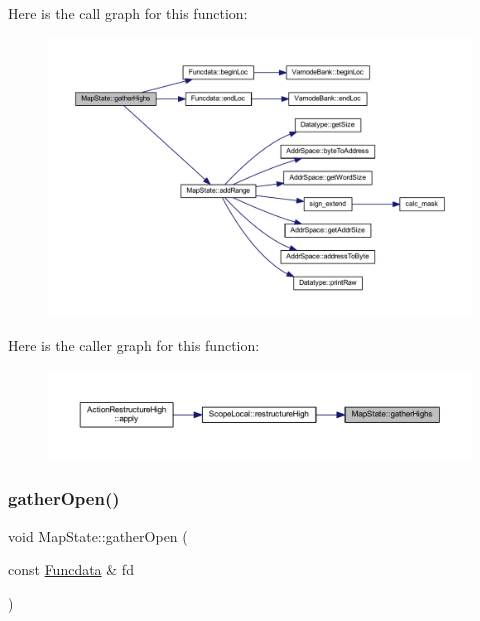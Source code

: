 Here is the call graph for this function\+:
\nopagebreak
\begin{figure}[H]
\begin{center}
\leavevmode
\includegraphics[width=350pt]{class_map_state_ac3a0c8da3331067931f75269daa81aed_cgraph}
\end{center}
\end{figure}
Here is the caller graph for this function\+:
\nopagebreak
\begin{figure}[H]
\begin{center}
\leavevmode
\includegraphics[width=350pt]{class_map_state_ac3a0c8da3331067931f75269daa81aed_icgraph}
\end{center}
\end{figure}
\mbox{\label{class_map_state_a43f627e6a51815b273f5dfbcc71ac605}} 
\subsubsection{\texorpdfstring{gatherOpen()}{gatherOpen()}}
{\footnotesize\ttfamily void Map\+State\+::gather\+Open (\begin{DoxyParamCaption}\item[{const \mbox{\hyperlink{class_funcdata}{Funcdata}} \&}]{fd }\end{DoxyParamCaption})}



